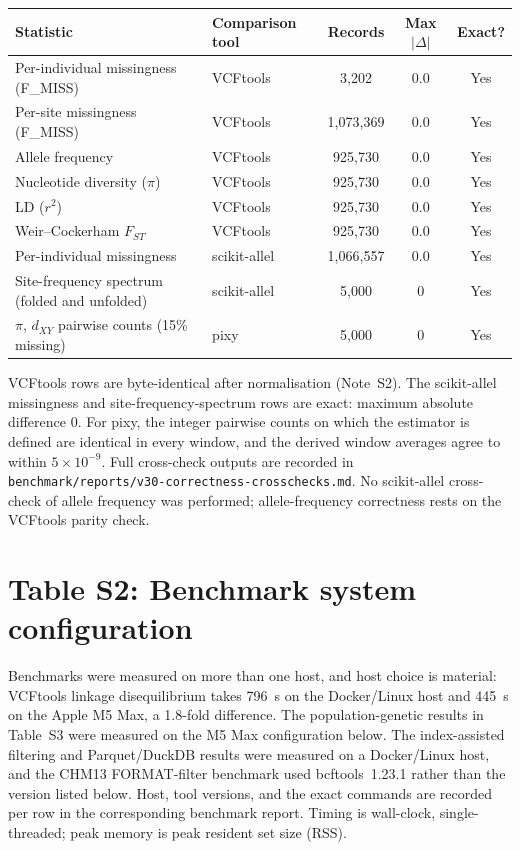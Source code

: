 \documentclass[11pt]{article}
\begin{document}
\begin{table}[ht]
\centering
\small
\begin{tabularx}{\linewidth}{lXccc}
\toprule
Statistic & Comparison tool & Records & Max $|\Delta|$ & Exact? \\
\midrule
Per-individual missingness (F\_MISS) & VCFtools & 3,202 & 0.0 & Yes \\
Per-site missingness (F\_MISS) & VCFtools & 1,073,369 & 0.0 & Yes \\
Allele frequency & VCFtools & 925,730 & 0.0 & Yes \\
Nucleotide diversity ($\pi$) & VCFtools & 925,730 & 0.0 & Yes \\
LD ($r^{2}$) & VCFtools & 925,730 & 0.0 & Yes \\
Weir--Cockerham $F_{ST}$ & VCFtools & 925,730 & 0.0 & Yes \\
Per-individual missingness & scikit-allel & 1,066,557 & 0.0 & Yes \\
Site-frequency spectrum (folded and unfolded) & scikit-allel & 5,000 & 0 & Yes \\
$\pi$, $d_{XY}$ pairwise counts (15\% missing) & pixy & 5,000 & 0 & Yes \\
\bottomrule
\end{tabularx}
\vspace{4pt}

\footnotesize{VCFtools rows are byte-identical after normalisation (Note~S2).
The scikit-allel missingness and site-frequency-spectrum rows are exact: maximum
absolute difference 0. For pixy, the integer pairwise counts on which the
estimator is defined are identical in every window, and the derived window
averages agree to within $5 \times 10^{-9}$. Full cross-check outputs are
recorded in \texttt{benchmark/reports/v30-correctness-crosschecks.md}. No
scikit-allel cross-check of allele frequency was performed; allele-frequency
correctness rests on the VCFtools parity check.}
\end{table}

\newpage
\section*{Table S2: Benchmark system configuration}

Benchmarks were measured on more than one host, and host choice is material:
VCFtools linkage disequilibrium takes 796~s on the Docker/Linux host and 445~s
on the Apple M5 Max, a 1.8-fold difference. The population-genetic results in
Table~S3 were measured on the M5 Max configuration below. The index-assisted
filtering and Parquet/DuckDB results were measured on a Docker/Linux host, and
the CHM13 FORMAT-filter benchmark used bcftools~1.23.1 rather than the version
listed below. Host, tool versions, and the exact commands are recorded per row
in the corresponding benchmark report. Timing is wall-clock, single-threaded;
peak memory is peak resident set size (RSS).
\end{document}
